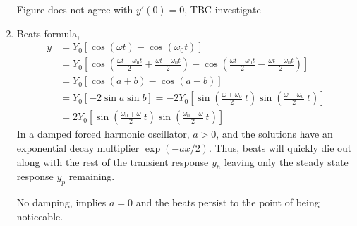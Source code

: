 \begin{enumerate}
          \begin{figure}[H]
              \centering
          \end{figure}

          Figure does not agree with $ y'(0) = 0 $, TBC investigate

    \item Beats formula,
          \begin{align}
              y & = Y_{0}[\cos(\omega t) - \cos(\omega_{0} t)]                       \\
                & = Y_{0}\left[\cos\left( \frac{\omega t + \omega_{0}t}{2}
                  + \frac{\omega t - \omega_{0}t}{2} \right)
                  - \cos\left( \frac{\omega t + \omega_{0}t}{2} - \frac{\omega t
              - \omega_{0}t}{2} \right)\right]                                       \\
                & = Y_{0} [\cos(a+b) - \cos(a-b)]                                    \\
                & = Y_{0}[-2\sin a \sin b] = -2Y_{0} \left[ \sin\left( \frac{\omega
                      + \omega_{0}}{2}\ t \right)
              \sin\left( \frac{\omega - \omega_{0}}{2}\ t \right)\right]             \\
                & = 2Y_{0}\left[ \sin\left( \frac{\omega_{0} + \omega}{2}\ t \right)
                  \sin\left( \frac{\omega_{0} - \omega}{2}\ t \right)\right]
          \end{align}
          In a damped forced harmonic oscillator, $ a > 0 $, and the solutions have an
          exponential decay multiplier $ \exp(-ax/2) $. Thus, beats will quickly die out
          along with the rest of the transient response $ y_{h} $ leaving only the
          steady state response $ y_{p} $ remaining. \par
          No damping, implies $ a = 0 $ and the beats persist to the point of being
          noticeable.


\end{enumerate}

